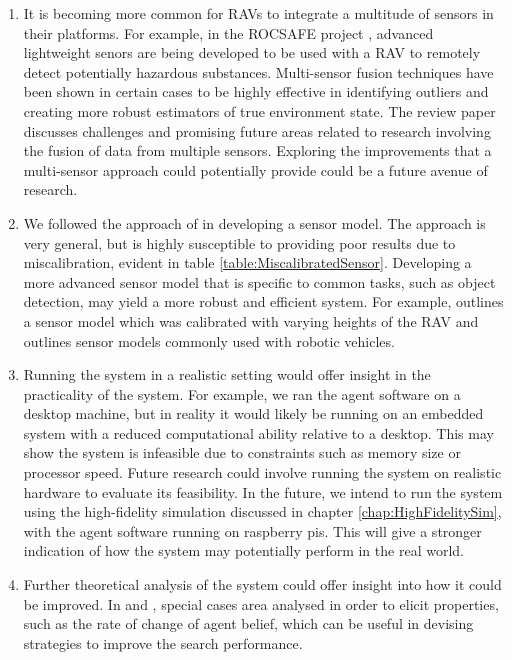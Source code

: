 \begin{enumerate}
    \item It is becoming more common for RAVs to integrate a multitude of sensors in their platforms. For example, in the ROCSAFE project \cite{rocsafeNUIG}, advanced lightweight senors are being developed to be used with a RAV to remotely detect potentially hazardous substances. Multi-sensor fusion techniques have been shown in certain cases to be highly effective in identifying outliers and creating more robust estimators of true environment state. The review paper \cite{Khaleghi2013MultisensorState-of-the-art} discusses challenges and promising future areas related to research involving the fusion of data from multiple sensors. Exploring the improvements that a multi-sensor approach could potentially provide could be a future avenue of research.
    \item  We followed the approach of \cite{Chung2007ASearch} in developing a sensor model. The approach is very general, but is highly susceptible to providing poor results due to miscalibration, evident in table \ref{table:MiscalibratedSensor}. Developing a more advanced sensor model that is specific to common tasks, such as object detection, may yield a more robust and efficient system. For example, \cite{Symington2010ProbabilisticUAVs} outlines a sensor model which was calibrated with varying heights of the RAV and \cite{ThrunLearningModels} outlines sensor models commonly used with robotic vehicles.
    \item Running the system in a realistic setting would offer insight in the practicality of the system. For example, we ran the agent software on a desktop machine, but in reality it would likely be running on an embedded system with a reduced computational ability relative to a desktop. This may show the system is infeasible due to constraints such as memory size or processor speed. Future research could involve running the system on realistic hardware to evaluate its feasibility. In the future, we intend to run the system using the high-fidelity simulation discussed in chapter \ref{chap:HighFidelitySim}, with the agent software running on raspberry pis. This will give a stronger indication of how the system may potentially perform in the real world.
    \item Further theoretical analysis of the system could offer insight into how it could be improved. In \cite{Chung2012AnalysisStrategies} and \cite{Chung2009ProbabilisticAgents}, special cases area analysed in order to elicit properties, such as the rate of change of agent belief, which can be useful in devising strategies to improve the search performance.
\end{enumerate}